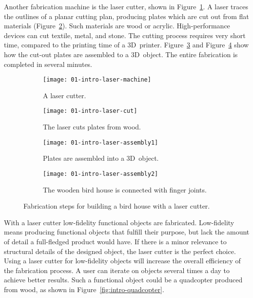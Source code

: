 \documentclass[../ClassicThesis.tex]{subfiles}
\begin{document}

Another fabrication machine is the laser cutter, shown in
Figure~\ref{fig:intro-laser:machine}. A laser traces the
outlines of a planar cutting plan, producing plates which
are cut out from flat materials
(Figure~\ref{fig:intro-laser:cut}). Such materials are wood
or acrylic. High-performance devices can cut textile,
metal, and stone. The cutting process requires very short
time, compared to the printing time of a 3D~printer.
Figure~\ref{fig:intro-laser:assembly1} and
Figure~\ref{fig:intro-laser:assembly2} show how the cut-out
plates are assembled to a 3D~object. The entire fabrication
is completed in several minutes.


\begin{figure}[!ht]
  \centering
  \begin{subfigure}[a]{0.49\textwidth}
    \texttt{[image: 01-intro-laser-machine]}
    \caption{A laser cutter.}
    \label{fig:intro-laser:machine}
  \end{subfigure}
  \begin{subfigure}[b]{0.49\textwidth}
    \texttt{[image: 01-intro-laser-cut]}
    \caption{The laser cuts plates from wood.}
    \label{fig:intro-laser:cut}
  \end{subfigure}
  \begin{subfigure}[c]{0.49\textwidth}
    \texttt{[image: 01-intro-laser-assembly1]}
    \caption{Plates are assembled into a 3D~object. }
    \label{fig:intro-laser:assembly1}
  \end{subfigure}
  \begin{subfigure}[d]{0.49\textwidth}
    \texttt{[image: 01-intro-laser-assembly2]}
    \caption{The wooden bird house is connected with finger
      joints.}
    \label{fig:intro-laser:assembly2}
  \end{subfigure}
  \caption{Fabrication steps for building a bird house with
    a laser cutter.}
  \label{fig:intro-laser}
\end{figure}

With a laser cutter low-fidelity functional objects are
fabricated. Low-fidelity means producing functional objects
that fulfill their purpose, but lack the amount of detail a
full-fledged product would have. If there is a minor
relevance to structural details of the designed object, the
laser cutter is the perfect choice. Using a laser cutter for
low-fidelity objects will increase the overall efficiency of
the fabrication process. A user can iterate on objects
several times a day to achieve better results.
Such a functional object could be a quadcopter produced from
wood, as shown in Figure~\ref{fig:intro-quadcopter}.
\end{document}
